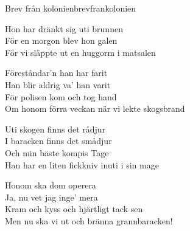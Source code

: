\begin{song}{Brev från kolonien}{brevfrankolonien}
\begin{vers}
Hon har dränkt sig uti brunnen\\
För en morgon blev hon galen\\
För vi släppte ut en huggorm i matsalen\\
\end{vers}
\begin{vers}
Föreståndar'n han har farit\\
Han blir aldrig va' han varit\\
För polisen kom och tog hand\\
Om honom förra veckan när vi lekte skogsbrand\\
\end{vers}
\begin{vers}
Uti skogen finns det rådjur\\
I baracken finns det smådjur\\
Och min bäste kompis Tage\\
Han har en liten fickkniv inuti i sin mage\\
\end{vers}
\begin{vers}
Honom ska dom operera\\
Ja, nu vet jag inge' mera\\
Kram och kyss och hjärtligt tack sen\\
Men nu ska vi ut och bränna grannbaracken!\\
\end{vers}
\end{song}
